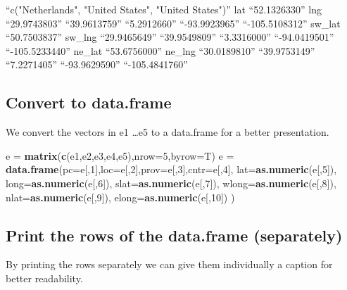 \documentclass[]{article}
\newenvironment{Shaded}{\begin{snugshade}}{\end{snugshade}}
\newcommand{\KeywordTok}[1]{\textcolor[rgb]{0.13,0.29,0.53}{\textbf{{#1}}}}
\newcommand{\DataTypeTok}[1]{\textcolor[rgb]{0.13,0.29,0.53}{{#1}}}
\newcommand{\DecValTok}[1]{\textcolor[rgb]{0.00,0.00,0.81}{{#1}}}
\newcommand{\StringTok}[1]{\textcolor[rgb]{0.31,0.60,0.02}{{#1}}}
\newcommand{\NormalTok}[1]{{#1}}
\begin{document}
``c("Netherlands", "United States", "United States")'' lat
``52.1326330'' lng ``29.9743803'' ``39.9613759'' ``5.2912660''
``-93.9923965'' ``-105.5108312'' sw\_lat ``50.7503837'' sw\_lng
``29.9465649'' ``39.9549809'' ``3.3316000'' ``-94.0419501''
``-105.5233440'' ne\_lat ``53.6756000'' ne\_lng ``30.0189810''
``39.9753149'' ``7.2271405'' ``-93.9629590'' ``-105.4841760''

\subsection{Convert to data.frame}\label{convert-to-data.frame}

We convert the vectors in e1 \ldots{}e5 to a data.frame for a better
presentation.

\begin{Shaded}
\begin{Highlighting}[]
\NormalTok{e =}\StringTok{ }\KeywordTok{matrix}\NormalTok{(}\KeywordTok{c}\NormalTok{(e1,e2,e3,e4,e5),}\DataTypeTok{nrow=}\DecValTok{5}\NormalTok{,}\DataTypeTok{byrow=}\NormalTok{T)}
\NormalTok{e =}\StringTok{ }\KeywordTok{data.frame}\NormalTok{(}\DataTypeTok{pc=}\NormalTok{e[,}\DecValTok{1}\NormalTok{],}\DataTypeTok{loc=}\NormalTok{e[,}\DecValTok{2}\NormalTok{],}\DataTypeTok{prov=}\NormalTok{e[,}\DecValTok{3}\NormalTok{],}\DataTypeTok{cntr=}\NormalTok{e[,}\DecValTok{4}\NormalTok{],}
        \DataTypeTok{lat=}\KeywordTok{as.numeric}\NormalTok{(e[,}\DecValTok{5}\NormalTok{]),   }\DataTypeTok{long=}\KeywordTok{as.numeric}\NormalTok{(e[,}\DecValTok{6}\NormalTok{]),}
        \DataTypeTok{slat=}\KeywordTok{as.numeric}\NormalTok{(e[,}\DecValTok{7}\NormalTok{]), }\DataTypeTok{wlong=}\KeywordTok{as.numeric}\NormalTok{(e[,}\DecValTok{8}\NormalTok{]),}
        \DataTypeTok{nlat=}\KeywordTok{as.numeric}\NormalTok{(e[,}\DecValTok{9}\NormalTok{]), }\DataTypeTok{elong=}\KeywordTok{as.numeric}\NormalTok{(e[,}\DecValTok{10}\NormalTok{])   )}
\end{Highlighting}
\end{Shaded}

\subsection{Print the rows of the data.frame
(separately)}\label{print-the-rows-of-the-data.frame-separately}

By printing the rows separately we can give them individually a caption
for better readability.
\end{document}
